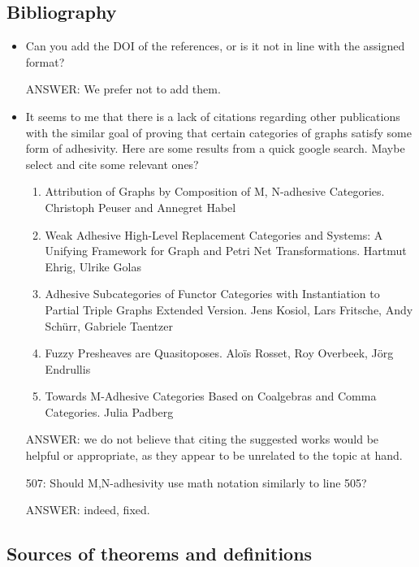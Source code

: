 \documentclass[english,11pt,a4paper]{article}
\begin{document}
\subsection*{Bibliography}
\begin{itemize}
	\item  Can you add the DOI of the references, or is it not in line with the assigned format?
	
	ANSWER: We prefer not to add them.
	
	\item It seems to me that there is a lack of citations regarding other publications with the similar goal of proving that certain categories of graphs satisfy some form of adhesivity. Here are some results from a quick google search. Maybe select and cite some relevant ones?
	\begin{enumerate}
		\item  Attribution of Graphs by Composition of M, N-adhesive Categories. Christoph Peuser and Annegret Habel
		\item Weak Adhesive High-Level Replacement Categories and Systems: A Unifying Framework for Graph and Petri Net Transformations. Hartmut Ehrig, Ulrike Golas
		\item Adhesive Subcategories of Functor Categories with Instantiation to Partial Triple Graphs Extended Version. Jens Kosiol, Lars Fritsche, Andy Schürr, Gabriele Taentzer
		\item  Fuzzy Presheaves are Quasitoposes. Aloïs Rosset, Roy Overbeek, Jörg Endrullis
		\item  Towards M-Adhesive Categories Based on Coalgebras and Comma Categories. Julia Padberg
	\end{enumerate}
	
	ANSWER: we do not believe that citing the suggested works would be helpful or appropriate, as they appear to be unrelated to the topic at hand.
	
	
	507: Should M,N-adhesivity use math notation similarly to line 505?
	
	ANSWER: indeed, fixed.
	
	
\end{itemize}

\subsection*{Sources of theorems and definitions}
\end{document}
